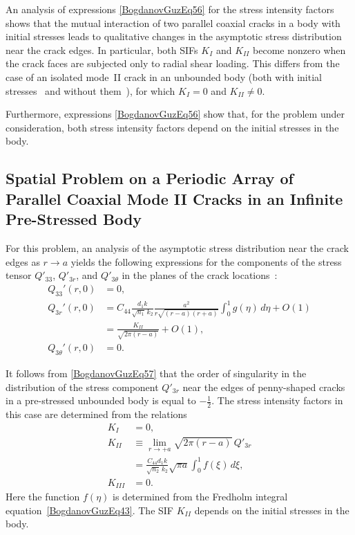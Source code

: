 An analysis of expressions \eqref{BogdanovGuzEq56} for the stress intensity
factors shows that the mutual interaction of two parallel coaxial cracks in a
body with initial stresses leads to qualitative changes in the asymptotic
stress distribution near the crack edges. In particular, both SIFs $K_{I}$ and
$K_{II}$ become nonzero when the crack faces are subjected only to radial
shear loading. This differs from the case of an isolated mode~II crack in an
unbounded body (both with initial stresses~\cite{BogdanovGuz27} and without
them~\cite{BogdanovGuz16}), for which $K_{I}=0$ and $K_{II}\ne 0$.

Furthermore, expressions \eqref{BogdanovGuzEq56} show that, for the problem
under consideration, both stress intensity factors depend on the initial
stresses in the body.

\subsection{Spatial Problem on a Periodic Array of Parallel Coaxial Mode II Cracks in an Infinite Pre-Stressed Body}

For this problem, an analysis of the asymptotic stress distribution near the
crack edges as $r\to a$ yields the following expressions for the components of
the stress tensor $Q'_{33}$, $Q'_{3r}$, and $Q'_{3\theta}$ in the planes of the
crack locations~\cite{BogdanovGuz32}:
\begin{equation}
	\label{BogdanovGuzEq57}
	\begin{aligned}		
		Q_{33}'(r,0) &= 0,
		\\
		Q_{3r}'(r,0)
		&=
		C_{44}\frac{d_{1}k}{\sqrt{n_{1}}\,k_{2}}
			\frac{a^{2}}{r\sqrt{(r-a)(r+a)}}
			\int_{0}^{1} g(\eta)\,d\eta
			+O(1)
			\\
			&=
			\frac{K_{II}}{\sqrt{2\pi(r-a)}}+O(1),
		\\
		Q_{3\theta}'(r,0) &= 0 .
	\end{aligned}
\end{equation}

It follows from \eqref{BogdanovGuzEq57} that the order of singularity in the
distribution of the stress component $Q'_{3r}$ near the edges of penny-shaped
cracks in a pre-stressed unbounded body is equal to $-\tfrac12$. The stress
intensity factors in this case are determined from the relations
\begin{equation}
	\label{BogdanovGuzEq58}
	\begin{aligned}
		K_{I} &= 0,
		\\		
		K_{II}
		&\equiv
			 \lim_{r\to +a}\sqrt{2\pi(r-a)}\,Q'_{3r}
			\\
			&=
			\frac{C_{44} d_{1} k}{\sqrt{n_{2}}\,k_{2}}
			\sqrt{\pi a}
			\int_{0}^{1} f(\xi)\,d\xi ,
		\\
		K_{III} &= 0 .		
	\end{aligned}
\end{equation}
%
Here the function $f(\eta)$ is determined from the Fredholm integral
equation~\eqref{BogdanovGuzEq43}. The SIF $K_{II}$
depends on the initial stresses in the body.


